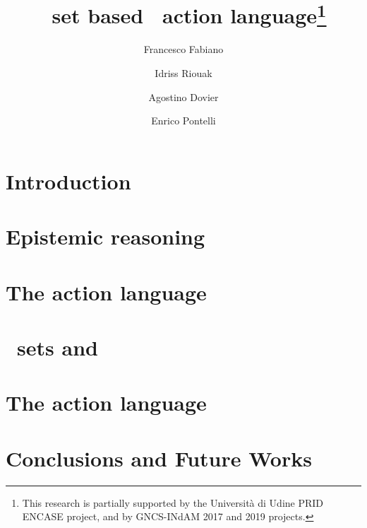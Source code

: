 \documentclass[runningheads]{utils/llncs}
\begin{document}
	\title{\Nwf\ set based \mAGep\ action language\thanks{This research is partially supported by the Universit\`a di Udine PRID ENCASE project, and by GNCS-INdAM 2017 and 2019 projects.}}
	\author{Francesco Fabiano%
		\and Idriss Riouak%
		\and Agostino Dovier%
		\and Enrico Pontelli}%
	\maketitle              %
	
	\section{Introduction}
	
	\section{Epistemic reasoning}\label{sec:epistemic_logic}
	
	\section{The action language \mAL}\label{sec:mal}
	
	\vspace{-0.0cm}
	\section{\Nwf\ sets and \PosS}\label{sec:possibilities}
	
	\section{The action language \ourL} \label{sec:contribution}
	
	\section{Conclusions and Future Works} \label{sec:conclusion}
	
	
	
	\newpage
	\appendix
	
	
\end{document}
